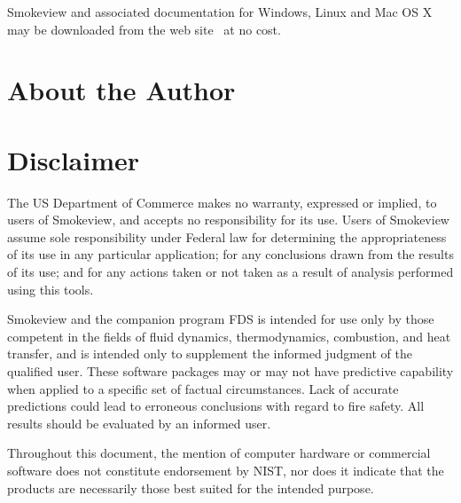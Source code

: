 \documentclass[11pt,twoside]{book}
\begin{document}
Smokeview and associated documentation for Windows, Linux and Mac
OS X may be downloaded from the web site {\bf
{}}\ at no cost.


\chapter{About the Author}

\begin{description}
\gforneybio
\end{description}


\chapter{Disclaimer}

The US Department of Commerce makes no warranty,
expressed or implied, to users of Smokeview, and accepts no
responsibility for its use. Users of Smokeview assume sole
responsibility under Federal law for determining the
appropriateness of its use in any particular application; for any
conclusions drawn from the results of its use; and for any actions
taken or not taken as a result of analysis performed using this
tools.

Smokeview and the companion program FDS is intended for use only
by those competent in the fields of fluid dynamics,
thermodynamics, combustion, and heat transfer, and is intended
only to supplement the informed judgment of the qualified user.
These software packages may or may not have predictive capability
when applied to a specific set of factual circumstances. Lack of
accurate predictions could lead to erroneous conclusions with
regard to fire safety. All results should be evaluated by an
informed user.

Throughout this document, the mention of computer hardware or
commercial software does not constitute endorsement by NIST,
nor does
it indicate that the products are necessarily those
best suited for the
intended purpose.
\end{document}
